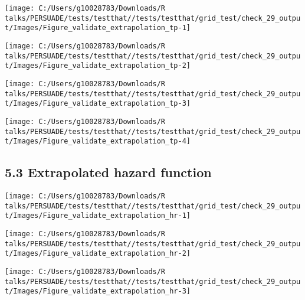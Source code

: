\documentclass[
]{article}
\begin{document}
\begin{flushleft}\texttt{[image: C:/Users/g10028783/Downloads/R talks/PERSUADE/tests/testthat//tests/testthat/grid\_test/check\_29\_output/Images/Figure\_validate\_extrapolation\_tp-1]} \end{flushleft}

\begin{flushleft}\texttt{[image: C:/Users/g10028783/Downloads/R talks/PERSUADE/tests/testthat//tests/testthat/grid\_test/check\_29\_output/Images/Figure\_validate\_extrapolation\_tp-2]} \end{flushleft}

\begin{flushleft}\texttt{[image: C:/Users/g10028783/Downloads/R talks/PERSUADE/tests/testthat//tests/testthat/grid\_test/check\_29\_output/Images/Figure\_validate\_extrapolation\_tp-3]} \end{flushleft}

\begin{flushleft}\texttt{[image: C:/Users/g10028783/Downloads/R talks/PERSUADE/tests/testthat//tests/testthat/grid\_test/check\_29\_output/Images/Figure\_validate\_extrapolation\_tp-4]} \end{flushleft}

\clearpage

\subsection{5.3 Extrapolated hazard
function}\label{extrapolated-hazard-function}

\begin{flushleft}\texttt{[image: C:/Users/g10028783/Downloads/R talks/PERSUADE/tests/testthat//tests/testthat/grid\_test/check\_29\_output/Images/Figure\_validate\_extrapolation\_hr-1]} \end{flushleft}

\begin{flushleft}\texttt{[image: C:/Users/g10028783/Downloads/R talks/PERSUADE/tests/testthat//tests/testthat/grid\_test/check\_29\_output/Images/Figure\_validate\_extrapolation\_hr-2]} \end{flushleft}

\begin{flushleft}\texttt{[image: C:/Users/g10028783/Downloads/R talks/PERSUADE/tests/testthat//tests/testthat/grid\_test/check\_29\_output/Images/Figure\_validate\_extrapolation\_hr-3]} \end{flushleft}
\end{document}
